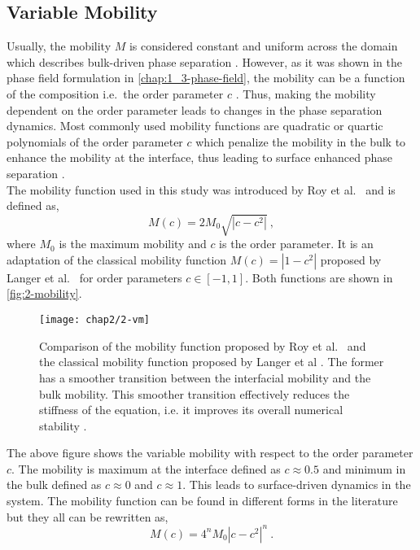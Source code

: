 \subsection{Variable Mobility}
    Usually, the mobility $M$ is considered constant and uniform across the domain which describes bulk-driven phase separation \cite{ZhuChenShenTikare1999,Voorhees2018}. However, as it was shown in the phase field formulation in \autoref{chap:1_3-phase-field}, the mobility can be a function of the composition i.e.\ the order parameter $c$ \cite{MoelansBlanpainWollants2008}. Thus, making the mobility dependent on the order parameter leads to changes in the phase separation dynamics.
    Most commonly used mobility functions are quadratic or quartic polynomials of the order parameter $c$ which penalize the mobility in the bulk to enhance the mobility at the interface, thus leading to surface enhanced phase separation \cite{ZhuChenShenTikare1999,Cahn1961,PesceMunch2021,CahnTaylor1994}.\\
    The mobility function used in this study was introduced by Roy et al.\ \cite{RoyVarmaGururajan2021} and is defined as,
    \begin{equation}
        M(c) = 2M_0 \sqrt{|c - c^2|}\ ,\label{eq:2-vm}
    \end{equation}
    where $M_0$ is the maximum mobility and $c$ is the order parameter. It is an adaptation of the classical mobility function $M(c) = |1-c^2|$ proposed by Langer et al.~\cite{Langer1975} for order parameters $c\in[-1,1]$. Both functions are shown in \autoref{fig:2-mobility}.
    \begin{figure}[H]
        \centering
        \texttt{[image: chap2/2-vm]}
        \caption{Comparison of the mobility function proposed by Roy et al.~\cite{RoyVarmaGururajan2021} and the classical mobility function proposed by Langer et al \cite{Langer1975}. The former has a smoother transition between the interfacial mobility and the bulk mobility. This smoother transition effectively reduces the stiffness of the equation, i.e. it improves its overall numerical stability \cite{Roy2021,LiTang2020}.}
        \label{fig:2-mobility}
    \end{figure}
    The above figure shows the variable mobility with respect to the order parameter $c$. The mobility is maximum at the interface defined as $c \approx 0.5$ and minimum in the bulk defined as $c \approx 0$ and $c \approx 1$. This leads to surface-driven dynamics in the system.
    The mobility function can be found in different forms in the literature but they all can be rewritten as,
    \begin{equation}
        M(c) = 4^n M_0 |c-c^2|^n\ .
        \label{eq:2-mobility-general}
    \end{equation}
